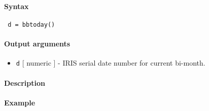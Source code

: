 


	\paragraph{Syntax}
 
 \begin{verbatim}
 d = bbtoday()
 \end{verbatim}
 
 \paragraph{Output arguments}
 
 \begin{itemize}
 \item
   \texttt{d} {[} numeric {]} - IRIS serial date number for current
   bi-month.
 \end{itemize}
 
 \paragraph{Description}
 
 \paragraph{Example}


